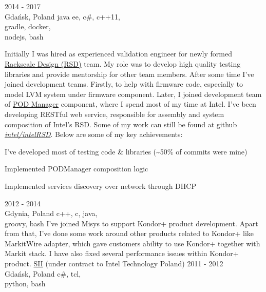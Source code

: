 \documentclass[a4paper,11pt]{cv4tw}%
\begin{document}
      {2014 - 2017\\Gdańsk, Poland}
      {java ee, c\#, c++11,\\gradle, docker,\\nodejs, bash}
      {Initially I was hired as experienced validation engineer for newly formed \href{https://www.intel.com/intelRSD}{Rackscale Design (RSD)} team.
        My role was to develop high quality testing libraries and provide mentorship for other team members.
        After some time I've joined development teams. Firstly, to help with firmware code, especially to model LVM system under firmware component.
        Later, I joined development team of
        \href{https://www.intel.com/content/www/us/en/architecture-and-technology/rack-scale-design/pod-manager-user-guide-v2-1.html}{POD Manager} component,
        where I spend most of my time at Intel. I've been developing RESTful web service, responsible for assembly and system composition of Intel's RSD. 
        Some of my work can still be found at github \emph{\href{https://github.com/intel/intelRSD}{intel/intelRSD}}.
        Below are some of my key achievements:
        \begin{missions}
        \item I've developed most of testing code \& libraries (\textasciitilde50\% of commits were mine)
        \item Implemented PODManager composition logic
        \item Implemented services discovery over network through DHCP
        \end{missions}
      }      
      {2012 - 2014\\Gdynia, Poland}
      {c++, c, java,\\groovy, bash}
      {I've joined Misys to support Kondor+ product development.
        Apart from that, I've done some work around other products related to Kondor+
        like MarkitWire adapter, which gave customers ability to use Kondor+ together
        with Markit stack. I have also fixed several performance issues within Kondor+ product.
      }
      {\href{https://sii.pl/en/}{SII} (under contract to Intel Technology Poland)}
      {2011 - 2012\\Gdańsk, Poland}
      {c\#, tcl,\\python, bash}
\end{document}
